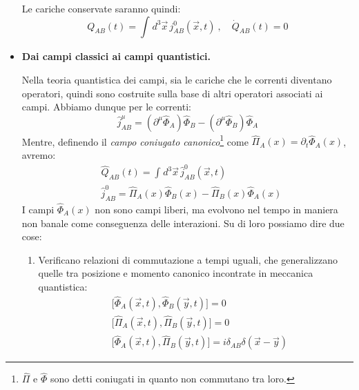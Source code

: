 \documentclass[../main.tex]{subfiles}
\begin{document}
\begin{itemize}
    Le cariche conservate saranno quindi:
    \begin{equation}
        \boxed{Q_{AB}(t) = \int_{}d^3\Vec{x}\, j^0_{AB}(\Vec{x},t)~,\quad \Dot{Q}_{AB}(t) = 0}
        \label{eq:noeth_charges_SON}
    \end{equation}

    \item \textbf{Dai campi classici ai campi quantistici.}

    Nella teoria quantistica dei campi, sia le cariche che le correnti diventano operatori, quindi sono costruite sulla base di altri operatori associati ai campi. Abbiamo dunque per le correnti:
    \begin{equation}
        \boxed{\hat{j}^\mu_{AB} = (\partial^\mu\hat{\Phi}_A)\hat{\Phi}_B - (\partial^\mu\hat{\Phi}_B)\hat{\Phi}_A}
        \label{eq:quantum_noether_curr}
    \end{equation}
    Mentre, definendo il \textit{campo coniugato canonico}\footnote{$\hat{\Pi}$ e $\hat{\Phi}$ sono detti coniugati in quanto non commutano tra loro.} come $\hat{\Pi}_A(x) = \partial_t\hat{\Phi}_A(x)$, avremo:
    \begin{equation}
        \boxed{
        \begin{aligned}
            &\hat{Q}_{AB}(t) = \int_{}d^3\Vec{x}\, \hat{j}^0_{AB}(\Vec{x},t) \\
            &\hat{j}^0_{AB} = \hat{\Pi}_A(x)\hat{\Phi}_B(x) - \hat{\Pi}_B(x)\hat{\Phi}_A(x)
        \end{aligned}
        }
        \label{eq:quantum_noether_charges}
    \end{equation}
    I campi $\hat{\Phi}_A(x)$ non sono campi liberi, ma evolvono nel tempo in maniera non banale come conseguenza delle interazioni. Su di loro possiamo dire due cose:
    \begin{enumerate}
        \item Verificano relazioni di commutazione a tempi uguali, che generalizzano quelle tra posizione e momento canonico incontrate in meccanica quantistica:
        \begin{equation}
            \begin{aligned}
                &\big[\hat{\Phi}_A(\Vec{x}, t), \hat{\Phi}_B(\Vec{y}, t)\big] = 0\\
                &\big[\hat{\Pi}_A(\Vec{x}, t), \hat{\Pi}_B(\Vec{y}, t)\big]= 0 \\
                &\big[\hat{\Phi}_A(\Vec{x}, t),\hat{\Pi}_B(\Vec{y}, t) \big]= i\delta_{AB}\delta(\Vec{x}-\Vec{y})

\end{aligned}
\end{equation}
\end{enumerate}
\end{itemize}
\end{document}
